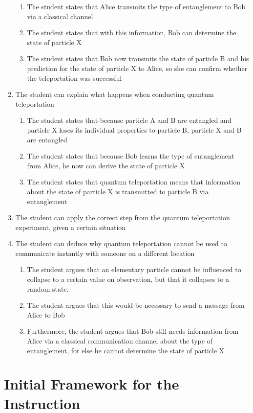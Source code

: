 \documentclass[11pt,twoside]{report} %
\begin{document}
\begin{enumerate}
\begin{enumerate}
\item The student states that Alice transmits the type of entanglement to Bob via a classical channel
\item The student states that with this information, Bob can determine the state of particle X
\item The student states that Bob now transmits the state of particle B and his prediction for the state of particle X to Alice, so she can confirm whether the teleportation was successful
\end{enumerate}
\item The student can explain what happens when conducting quantum teleportation
\begin{enumerate}
\item The student states that because particle A and B are entangled and particle X loses its individual properties to particle B, particle X and B are entangled
\item The student states that because Bob learns the type of entanglement from Alice, he now can derive the state of particle X
\item The student states that quantum teleportation means that information about the state of particle X is transmitted to particle B via entanglement
\end{enumerate}
\item The student can apply the correct step from the quantum teleportation experiment, given a certain situation
\item The student can deduce why quantum teleportation cannot be used to communicate instantly with someone on a different location
\begin{enumerate}
\item The student argues that an elementary particle cannot be influenced to collapse to a certain value on observation, but that it collapses to a random state.
\item The student argues that this would be necessary to send a message from Alice to Bob
\item Furthermore, the student argues that Bob still needs information from Alice via a classical communication channel about the type of entanglement, for else he cannot determine the state of particle X
\end{enumerate}
\end{enumerate}

\newpage

\section{Initial Framework for the Instruction}
\label{app:framework1}
\end{document}
